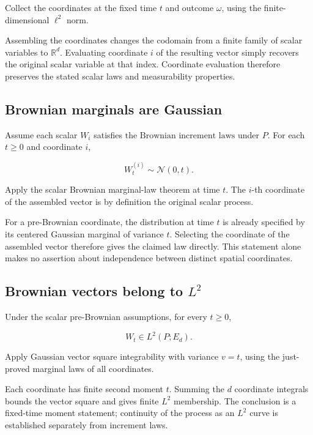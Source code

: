 \documentclass[11pt,a4paper]{report}
\begin{document}
Collect the coordinates at the fixed time \(t\) and outcome \(\omega\), using the finite-dimensional \(\ell^2\) norm.



Assembling the coordinates changes the codomain from a finite family of scalar variables to \(\mathbb R^d\). Evaluating coordinate \(i\) of the resulting vector simply recovers the original scalar variable at that index. Coordinate evaluation therefore preserves the stated scalar laws and measurability properties.

\subsection{\texorpdfstring{Brownian marginals are Gaussian}{Brownian marginals are Gaussian}}
\label{report-step-UnadjustedLangevin-GaussianMoments-lean-8}


Assume each scalar \(W_i\) satisfies \(\text{the Brownian increment laws}\) under \(P\). For each \(t\ge0\) and coordinate \(i\),

\[W_t^{(i)}\sim\mathcal N(0,t).\]

Apply the scalar Brownian marginal-law theorem at time \(t\). The \(i\)-th coordinate of the assembled vector is by definition the original scalar process.



For a pre-Brownian coordinate, the distribution at time \(t\) is already specified by its centered Gaussian marginal of variance \(t\). Selecting the coordinate of the assembled vector therefore gives the claimed law directly. This statement alone makes no assertion about independence between distinct spatial coordinates.

\subsection{\texorpdfstring{Brownian vectors belong to \(L^2\)}{Brownian vectors belong to L²}}
\label{report-step-UnadjustedLangevin-GaussianMoments-lean-9}


Under the scalar pre-Brownian assumptions, for every \(t\ge0\),

\[W_t\in L^2(P;E_d).\]

Apply Gaussian vector square integrability with variance \(v=t\), using the just-proved marginal laws of all coordinates.



Each coordinate has finite second moment \(t\). Summing the \(d\) coordinate integrals bounds the vector square and gives finite \(L^2\) membership. The conclusion is a fixed-time moment statement; continuity of the process as an \(L^2\) curve is established separately from increment laws.
\end{document}
